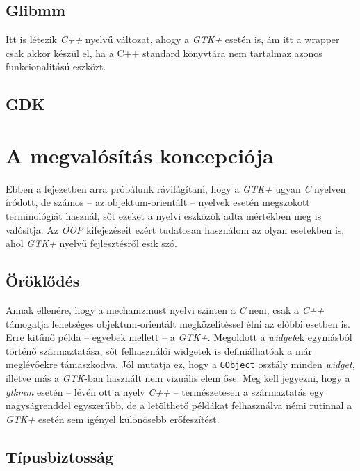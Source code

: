 \subsection{Glibmm}

Itt is létezik \textit{C++} nyelvű változat, ahogy a \textit{GTK+} esetén is, ám itt a wrapper csak akkor készül el, ha a C++ standard könyvtára nem tartalmaz azonos funkcionalitású eszközt.

\subsection{GDK}

\section{A megvalósítás koncepciója}

Ebben a fejezetben arra próbálunk rávilágítani, hogy a \textit{GTK+} ugyan \textit{C} nyelven íródott, de számos -- az objektum-orientált -- nyelvek esetén megszokott terminológiát használ, sőt ezeket a nyelvi eszközök adta mértékben meg is valósítja. Az \textit{OOP} kifejezéseit ezért tudatosan használom az olyan esetekben is, ahol \textit{GTK+} nyelvű fejlesztésről esik szó.

\subsection{Öröklődés}

Annak ellenére, hogy a mechanizmust nyelvi szinten a \textit{C} nem, csak a \textit{C++} támogatja lehetséges objektum-orientált megközelítéssel élni az előbbi esetben is. Erre kitűnő példa -- egyebek mellett -- a \textit{GTK+}. Megoldott a \textit{widget}ek egymásból történő származtatása, sőt felhasználói widgetek is definiálhatóak a már meglévőekre támaszkodva. Jól mutatja ez, hogy a \texttt{GObject} osztály minden \textit{widget}, illetve más a \textit{GTK}-ban használt nem vizuális elem őse. Meg kell jegyezni, hogy a \textit{gtkmm} esetén -- lévén ott a nyelv \textit{C++} -- természetesen a származtatás egy nagyságrenddel egyszerűbb, de a letölthető példákat felhasználva némi rutinnal a \textit{GTK+} esetén sem igényel különösebb erőfeszítést.

\subsection{Típusbiztosság}

